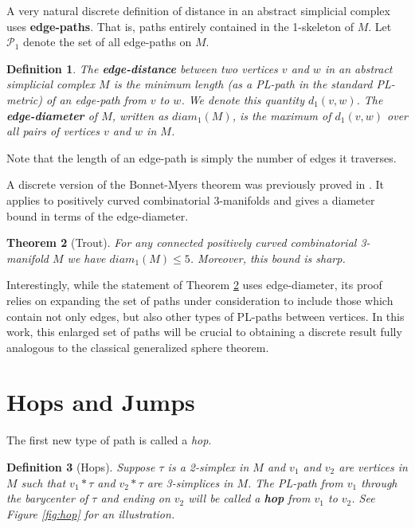 \documentclass[12pt]{article}
\newtheorem{thm}{Theorem}[section]
\newtheorem{dfn}[thm]{Definition}
\begin{document}
A very natural discrete definition of distance in an abstract simplicial complex uses \textbf{edge-paths}. That is, paths entirely contained in the 1-skeleton of $M$. Let $\mathcal{P}_1$ denote the set of all edge-paths on $M$.

\begin{dfn}The \textbf{edge-distance} between two vertices $v$ and $w$ in an abstract simplicial complex $M$ is the minimum length (as a PL-path in the standard PL-metric) of an edge-path from $v$ to $w$. We denote this quantity $d_1(v,w)$. The \textbf{edge-diameter} of $M$, written as $diam_1(M)$, is the maximum of $d_1(v,w)$ over all pairs of vertices $v$ and $w$ in $M$. 
\end{dfn}

\noindent Note that the length of an edge-path is simply the number of edges it traverses.

A discrete version of the Bonnet-Myers theorem was previously proved in \cite{Trout10}. It applies to positively curved combinatorial 3-manifolds and gives a diameter bound in terms of the edge-diameter.

\begin{thm}[Trout] For any connected positively curved combinatorial 3-manifold $M$ we have $diam_1(M)\leq 5$. Moreover, this bound is sharp.
\label{thm:discrete_BM}
\end{thm}

\noindent Interestingly, while the statement of Theorem \ref{thm:discrete_BM} uses edge-diameter, its proof relies on expanding the set of paths under consideration to include those which contain not only edges, but also other types of PL-paths between vertices. In this work, this enlarged set of paths will be crucial to obtaining a discrete result fully analogous to the classical generalized sphere theorem.

\section{Hops and Jumps}
The first new type of path is called a {\em hop}.

\begin{dfn}[Hops] Suppose $\tau$ is a 2-simplex in $M$ and $v_1$ and $v_2$ are vertices in $M$ such that $v_1*\tau$ and $v_2*\tau$ are 3-simplices in $M$. The PL-path from $v_1$ through the barycenter of $\tau$ and ending on $v_2$ will be called a \textbf{hop} from $v_1$ to $v_2$. See Figure \ref{fig:hop} for an illustration.
\end{dfn}
\end{document}
